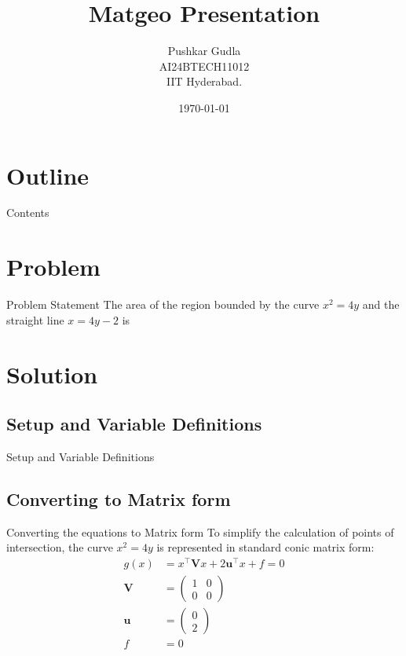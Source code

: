 \documentclass{beamer}
\title{Matgeo Presentation}
\author{Pushkar Gudla \\ AI24BTECH11012\\IIT Hyderabad.}
\date{\today}
\theoremstyle{remark}
\newcommand{\myvec}[1]{\ensuremath{\begin{pmatrix}#1\end{pmatrix}}}
\let\vec\mathbf
\numberwithin{equation}{section}
\begin{document}
\begin{frame}
\titlepage
\end{frame}

\section*{Outline}
\begin{frame}{Contents}
\tableofcontents    
\end{frame}

\section{Problem}
\begin{frame}{Problem Statement}
    The area of the region bounded by the curve $x^2=4y$ and the straight line $x=4y-2$ is
\end{frame}

\section{Solution}
\subsection{Setup and Variable Definitions}
\begin{frame}{Setup and Variable Definitions}
\begin{table}[h!]    
  \centering
  
  \caption{Variables and given data}
\end{table}
\end{frame}

\subsection{Converting to Matrix form}
\begin{frame}{Converting the equations to Matrix form}
    To simplify the calculation of points of intersection, the curve $x^2=4y$ is represented in standard conic matrix form:
    \begin{align}
        g(x) &= x^\top \vec{V}x + 2\vec{u}^\top x + f=0\\
        \vec{V} &= \myvec{1 & 0\\0 & 0}\\
	\vec{u} &= \myvec{0\\2}\\
	f &= 0
    \end{align}
\end{frame}
\end{document}
